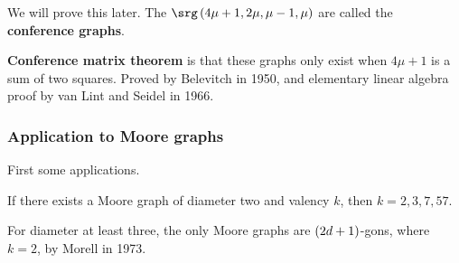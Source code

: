 We will prove this later. The $ \srg\br{4\mu + 1, 2\mu, \mu - 1, \mu} $ are called the \textbf{conference graphs}.

\begin{note*}
\textbf{Conference matrix theorem} is that these graphs only exist when $ 4\mu + 1 $ is a sum of two squares. Proved by Belevitch in 1950, and elementary linear algebra proof by van Lint and Seidel in 1966.
\end{note*}

\subsubsection{Application to Moore graphs}

First some applications.

\begin{theorem}
If there exists a Moore graph of diameter two and valency $ k $, then $ k = 2, 3, 7, 57 $.
\end{theorem}

\begin{note*}
For diameter at least three, the only Moore graphs are $ \br{2d + 1} $-gons, where $ k = 2 $, by Morell in 1973.
\end{note*}

